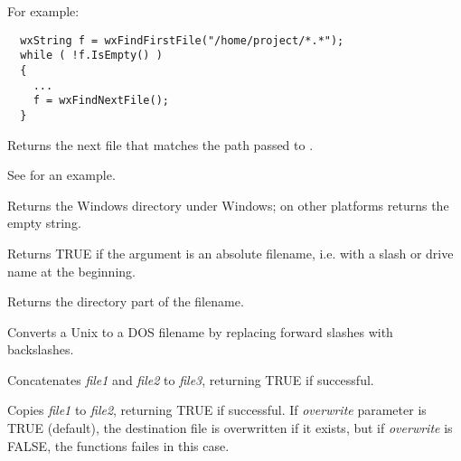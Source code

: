 For example:

\begin{verbatim}
  wxString f = wxFindFirstFile("/home/project/*.*");
  while ( !f.IsEmpty() )
  {
    ...
    f = wxFindNextFile();
  }
\end{verbatim}

\label{wxfindnextfile}


Returns the next file that matches the path passed to .

See  for an example.

\label{wxgetosdirectory}


Returns the Windows directory under Windows; on other platforms returns the empty string.



Returns TRUE if the argument is an absolute filename, i.e. with a slash
or drive name at the beginning.



Returns the directory part of the filename.



Converts a Unix to a DOS filename by replacing forward
slashes with backslashes.



Concatenates {\it file1} and {\it file2} to {\it file3}, returning
TRUE if successful.



Copies {\it file1} to {\it file2}, returning TRUE if successful. If
{\it overwrite} parameter is TRUE (default), the destination file is overwritten
if it exists, but if {\it overwrite} is FALSE, the functions failes in this
case.

